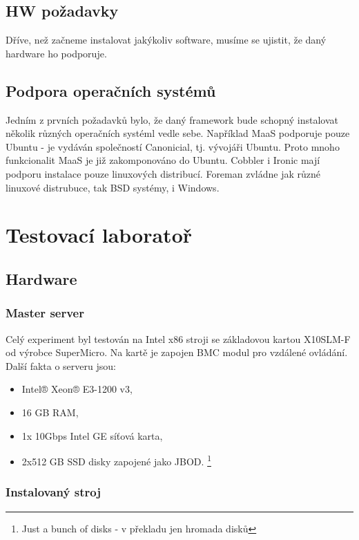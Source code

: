 \documentclass[thesis=B,czech]{FITthesis}[2012/06/26]
\begin{document}
\subsection{HW požadavky}

Dříve, než začneme instalovat jakýkoliv software, musíme se ujistit, že daný hardware ho podporuje.





\subsection{Podpora operačních systémů}

Jedním z prvních požadavků bylo, že daný framework bude schopný instalovat několik různých operačních systéml vedle sebe. Například MaaS podporuje pouze Ubuntu - je vydáván společností Canonicial, tj. vývojáři Ubuntu. Proto mnoho funkcionalit MaaS je již zakomponováno do Ubuntu. Cobbler i Ironic mají podporu instalace pouze linuxových distribucí. Foreman zvládne jak různé linuxové distrubuce, tak BSD systémy, i Windows.


\section{Testovací laboratoř}
\subsection{Hardware}
\subsubsection{Master server}

Celý experiment byl testován na Intel x86 stroji se základovou kartou X10SLM-F od výrobce SuperMicro. Na kartě je zapojen BMC modul pro vzdálené ovládání. Další fakta o serveru jsou:

\begin{itemize}
\item Intel® Xeon® E3-1200 v3,
\item 16 GB RAM,
\item 1x 10Gbps Intel GE síťová karta,
\item 2x512 GB SSD disky zapojené jako JBOD. \footnote{Just a bunch of disks - v překladu jen hromada disků}
\end{itemize}


\subsubsection{Instalovaný stroj}
\end{document}
